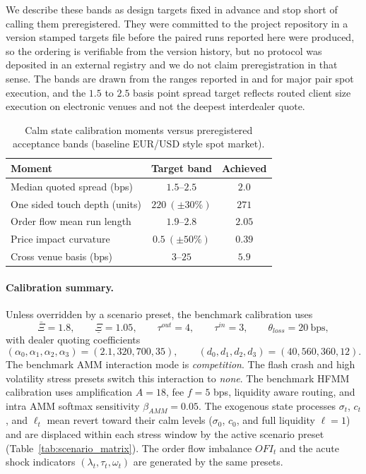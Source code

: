 \documentclass[a4paper,fleqn]{cas-sc}
\begin{document}
We describe these bands as design targets fixed in advance and stop short of calling them preregistered. They were committed to the project repository in a version stamped targets file before the paired runs reported here were produced, so the ordering is verifiable from the version history, but no protocol was deposited in an external registry and we do not claim preregistration in that sense. The bands are drawn from the ranges reported in \citet{ranaldo2022} and \citet{mancini2013} for major pair spot execution, and the \(1.5\) to \(2.5\) basis point spread target reflects routed client size execution on electronic venues and not the deepest interdealer quote.

\begin{table}[H]
\centering
\renewcommand{\arraystretch}{1.3}
\caption{Calm state calibration moments versus preregistered acceptance bands (baseline EUR/USD style spot market).}
\label{tab:calib}
\begin{tabular*}{\textwidth}{@{\extracolsep{\fill}}lcc@{}}
\toprule
Moment & Target band & Achieved \\
\midrule
Median quoted spread (bps) & $1.5$--$2.5$ & $2.0$ \\
One sided touch depth (units) & $220\ (\pm30\%)$ & $271$ \\
Order flow mean run length & $1.9$--$2.8$ & $2.05$ \\
Price impact curvature & $0.5\ (\pm50\%)$ & $0.39$ \\
Cross venue basis (bps) & $3$--$25$ & $5.9$ \\
\bottomrule
\end{tabular*}
\end{table}

\paragraph{Calibration summary.}
Unless overridden by a scenario preset, the benchmark calibration uses
\begin{equation}
\bar\Xi=1.8,\qquad \underline\Xi=1.05,\qquad \tau^{out}=4,\qquad \tau^{in}=3,\qquad \theta_{loss}=20\ \text{bps},
\end{equation}
with dealer quoting coefficients
\begin{equation}
(\alpha_0,\alpha_1,\alpha_2,\alpha_3)=(2.1,320,700,35),
\qquad
(d_0,d_1,d_2,d_3)=(40,560,360,12).
\end{equation}
The benchmark AMM interaction mode is \textit{competition}. The flash crash and high volatility stress presets switch this interaction to \textit{none}. The benchmark HFMM calibration uses amplification \(A=18\), fee \(f=5\) bps, liquidity aware routing, and intra AMM softmax sensitivity \(\beta_{AMM}=0.05\). The exogenous state processes \(\sigma_t\), \(c_t\), and \(\ell_t\) mean revert toward their calm levels (\(\sigma_0\), \(c_0\), and full liquidity \(\ell=1\)) and are displaced within each stress window by the active scenario preset (Table~\ref{tab:scenario_matrix}). The order flow imbalance \(OFI_t\) and the acute shock indicators \((\lambda_t,\tau_t,\omega_t)\) are generated by the same presets.
\end{document}
